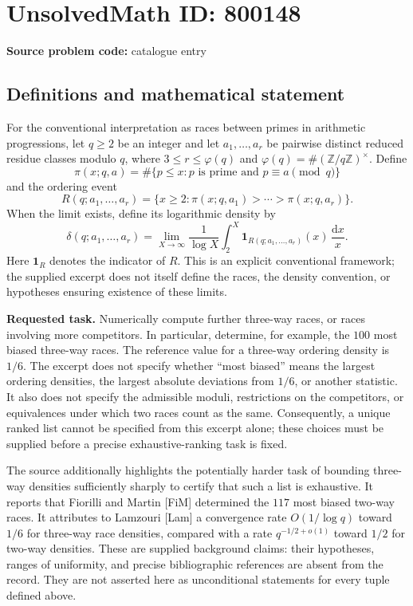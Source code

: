 \documentclass[11pt]{article}
\newcommand{\Z}{\mathbb{Z}}
\begin{document}
\section*{UnsolvedMath ID: 800148}
\textbf{Source problem code:} catalogue entry
\subsection{Definitions and mathematical statement}
For the conventional interpretation as races between primes in arithmetic progressions, let \(q\ge 2\) be an integer and let \(a_1,\ldots,a_r\) be pairwise distinct reduced residue classes modulo \(q\), where \(3\le r\le\varphi(q)\) and \(\varphi(q)=\#(\Z/q\Z)^\times\). Define
\[
\pi(x;q,a)=\#\{p\le x:p\text{ is prime and }p\equiv a\pmod q\}
\]
and the ordering event
\[
R(q;a_1,\ldots,a_r)=\{x\ge2:\pi(x;q,a_1)>\cdots>\pi(x;q,a_r)\}.
\]
When the limit exists, define its logarithmic density by
\[
\delta(q;a_1,\ldots,a_r)=\lim_{X\to\infty}\frac{1}{\log X}\int_2^X\mathbf 1_{R(q;a_1,\ldots,a_r)}(x)\,\frac{\mathrm dx}{x}.
\]
Here \(\mathbf 1_R\) denotes the indicator of \(R\). This is an explicit conventional framework; the supplied excerpt does not itself define the races, the density convention, or hypotheses ensuring existence of these limits.

\textbf{Requested task.} Numerically compute further three-way races, or races involving more competitors. In particular, determine, for example, the \(100\) most biased three-way races. The reference value for a three-way ordering density is \(1/6\). The excerpt does not specify whether ``most biased'' means the largest ordering densities, the largest absolute deviations from \(1/6\), or another statistic. It also does not specify the admissible moduli, restrictions on the competitors, or equivalences under which two races count as the same. Consequently, a unique ranked list cannot be specified from this excerpt alone; these choices must be supplied before a precise exhaustive-ranking task is fixed.

The source additionally highlights the potentially harder task of bounding three-way densities sufficiently sharply to certify that such a list is exhaustive. It reports that Fiorilli and Martin [FiM] determined the \(117\) most biased two-way races. It attributes to Lamzouri [Lam] a convergence rate \(O(1/\log q)\) toward \(1/6\) for three-way race densities, compared with a rate \(q^{-1/2+o(1)}\) toward \(1/2\) for two-way densities. These are supplied background claims: their hypotheses, ranges of uniformity, and precise bibliographic references are absent from the record. They are not asserted here as unconditional statements for every tuple defined above.
\end{document}
